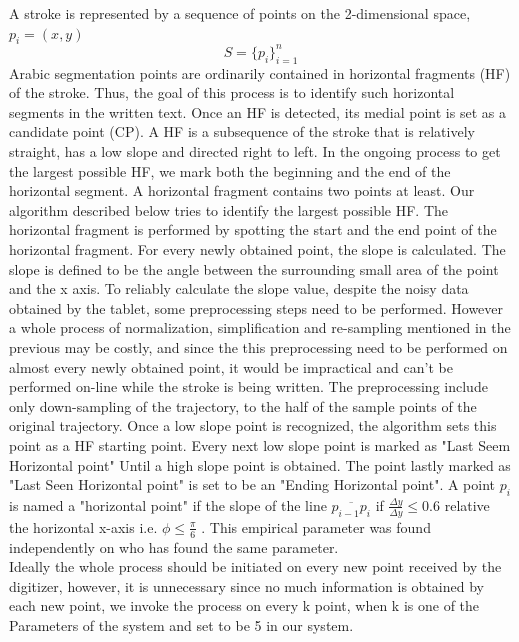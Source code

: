 \documentclass[journal,compsoc]{IEEEtran}
\begin{document}
A stroke is represented by a sequence of points on the 2-dimensional space, $p_{i}=(x,y)$ 
\begin{equation}
S=\{p_{i}\}_{i=1}^{n}
\end{equation}
Arabic segmentation points are ordinarily contained in horizontal fragments (HF) of the stroke. Thus, the goal of this process is to identify such horizontal segments in the written text. Once an HF is detected, its medial point is set as a candidate point (CP). A HF is a subsequence of the stroke that is relatively straight, has a low slope and directed right to left. In the ongoing process to get the largest possible HF, we mark both the beginning and the end of the horizontal segment. A horizontal fragment contains two points at least. Our algorithm described below tries to identify the largest possible HF.
The horizontal fragment is performed by spotting the start and the end point of the horizontal fragment. For every newly obtained point, the slope is calculated. The slope is defined to be the angle between the surrounding small area of the point and the x axis. To reliably calculate the slope value, despite the noisy data obtained by the tablet, some preprocessing steps need to be performed. However a whole process of normalization, simplification and re-sampling mentioned in the previous may be costly, and since the this preprocessing need to be performed on almost every newly obtained point, it would be impractical and can't be performed on-line while the stroke is being written. 
The preprocessing include only down-sampling of the trajectory, to the half of the sample points of the original trajectory.
Once a low slope point is recognized, the algorithm sets this point as a HF starting point. Every next low slope point is marked as "Last Seem Horizontal point" Until a high slope point is obtained. The point lastly marked as "Last Seen Horizontal point" is set to be an "Ending Horizontal point".
A point $p_{i}$ is named a "horizontal point" if the slope of the line $\overline{p_{i-1}p_{i}}$ if $\frac{\Delta y}{\Delta y}\leq0.6$ relative the horizontal x-axis i.e. $\phi \leq \frac{\pi}{6}$ . This empirical parameter was found independently on \cite{daifallah2009recognition} who has found the same parameter. \\

Ideally the whole process should be initiated on every new point received by the digitizer, however, it is unnecessary since no much information is obtained by each new point, we invoke the process on every k point, when k is one of the Parameters of the system and set to be 5 in our system.  
\end{document}
